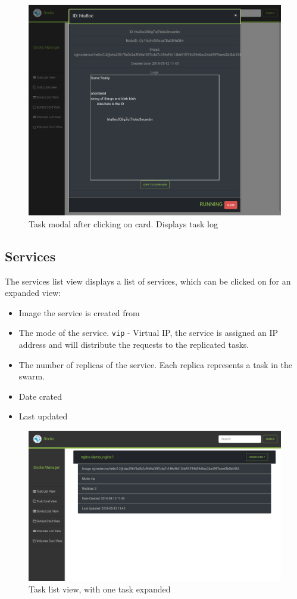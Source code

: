 \documentclass[]{article}
\providecommand{\tightlist}{%
	\setlength{\itemsep}{0pt}\setlength{\parskip}{0pt}}
\let\oldtexttt\texttt
\renewcommand{\texttt}[1]{
	\colorbox{Light}{\oldtexttt{#1}}
}
\begin{document}
\begin{figure}[H]
	\centering
	\includegraphics[scale=0.4]{task_card_modal.png}
	\caption{Task modal after clicking on card. Displays task log}
\end{figure}

\subsection{Services}

The services list view displays a list of services, which can be clicked on for an expanded view:
\begin{itemize}
	\tightlist
	\item Image the service is created from
	\item The mode of the service. \texttt{vip} - Virtual IP, the service is assigned an IP address and will distribute the requests to the replicated tasks.
	\item The number of replicas of the service. Each replica represents a task in the swarm.
	\item Date crated
	\item Last updated
\end{itemize}

\begin{figure}[H]
	\centering
	\includegraphics[scale=0.4]{service_list.png}
	\caption{Task list view, with one task expanded}
\end{figure}
\end{document}
